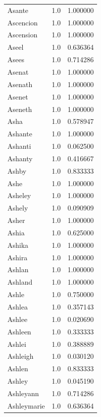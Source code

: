 \documentclass[
  letterpaper,
  DIV=11,
  numbers=noendperiod]{scrreprt}
\begin{document}
\begin{tabular}{lrr}
Asante          &   1.0 &   1.000000 \\
Ascencion       &   1.0 &   1.000000 \\
Ascension       &   1.0 &   1.000000 \\
Aseel           &   1.0 &   0.636364 \\
Asees           &   1.0 &   0.714286 \\
Asenat          &   1.0 &   1.000000 \\
Asenath         &   1.0 &   1.000000 \\
Asenet          &   1.0 &   1.000000 \\
Aseneth         &   1.0 &   1.000000 \\
Asha            &   1.0 &   0.578947 \\
Ashante         &   1.0 &   1.000000 \\
Ashanti         &   1.0 &   0.062500 \\
Ashanty         &   1.0 &   0.416667 \\
Ashby           &   1.0 &   0.833333 \\
Ashe            &   1.0 &   1.000000 \\
Asheley         &   1.0 &   1.000000 \\
Ashely          &   1.0 &   0.090909 \\
Asher           &   1.0 &   1.000000 \\
Ashia           &   1.0 &   0.625000 \\
Ashika          &   1.0 &   1.000000 \\
Ashira          &   1.0 &   1.000000 \\
Ashlan          &   1.0 &   1.000000 \\
Ashland         &   1.0 &   1.000000 \\
Ashle           &   1.0 &   0.750000 \\
Ashlea          &   1.0 &   0.357143 \\
Ashlee          &   1.0 &   0.020690 \\
Ashleen         &   1.0 &   0.333333 \\
Ashlei          &   1.0 &   0.388889 \\
Ashleigh        &   1.0 &   0.030120 \\
Ashlen          &   1.0 &   0.833333 \\
Ashley          &   1.0 &   0.045190 \\
Ashleyann       &   1.0 &   0.714286 \\
Ashleymarie     &   1.0 &   0.636364 \\

\end{tabular}
\end{document}
